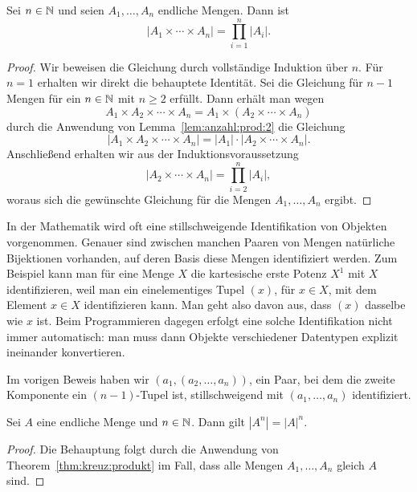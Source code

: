\begin{thm} \label{thm:kreuz:produkt}
	Sei $n \in \mathbb{N}$ und seien $A_1,\ldots, A_n$ endliche Mengen. Dann ist 
	\[
		|A_1 \times \cdots \times A_n|  = \prod_{i=1}^n |A_i|. 
	\]
\end{thm} 
\begin{proof}
	Wir beweisen die Gleichung durch vollständige Induktion über $n$.
	Für $n=1$ erhalten wir direkt die behauptete Identität. Sei die Gleichung für $n-1$ Mengen für ein $n \in \mathbb{N}$ mit $n \ge 2$ erfüllt. Dann erhält man wegen 
	\[
			A_1 \times A_2 \times \cdots \times A_n = A_1 \times (A_2 \times \cdots \times A_n)
	\]
	durch die Anwendung von Lemma~\ref{lem:anzahl:prod:2} die Gleichung 
	\[
		|A_1 \times A_2 \times \cdots \times A_n | = |A_1| \cdot |A_2 \times \cdots \times A_n|. 
	\]
	Anschließend erhalten wir aus der Induktionsvoraussetzung 
	\[
		|A_2 \times \cdots \times A_n| = \prod_{i=2}^n |A_i|,
	\]
	woraus sich die gewünschte Gleichung für die Mengen $A_1,\ldots,A_n$ ergibt. 
\end{proof} 

\begin{bem}
	In der Mathematik wird oft eine stillschweigende Identifikation von Objekten vorgenommen. Genauer sind zwischen manchen Paaren von Mengen natürliche Bijektionen vorhanden, auf deren Basis diese Mengen identifiziert werden. Zum Beispiel kann man für eine Menge $X$ die kartesische erste Potenz $X^1$ mit $X$ identifizieren, weil man ein einelementiges Tupel $(x)$, für $x \in X$, mit dem Element $x \in X$ identifizieren kann. Man geht also davon aus, dass $(x)$ dasselbe wie $x$ ist. Beim Programmieren dagegen erfolgt eine solche Identifikation nicht immer automatisch: man muss dann Objekte verschiedener Datentypen explizit ineinander konvertieren. 
	
	Im vorigen Beweis haben wir $(a_1,(a_2,\ldots,a_n))$, ein Paar, bei dem die zweite Komponente ein $(n-1)$-Tupel ist, stillschweigend mit $(a_1,\ldots,a_n)$ identifiziert. 
\end{bem} 

\begin{kor} \label{kor:product} 
	Sei $A$ eine endliche Menge und $n \in \mathbb{N}$. Dann gilt $|A^n| = |A|^n$. 
\end{kor}
\begin{proof}
	Die Behauptung folgt durch die Anwendung von Theorem~\ref{thm:kreuz:produkt} im Fall, dass alle Mengen $A_1,\ldots,A_n$ gleich $A$ sind. 
\end{proof}  


